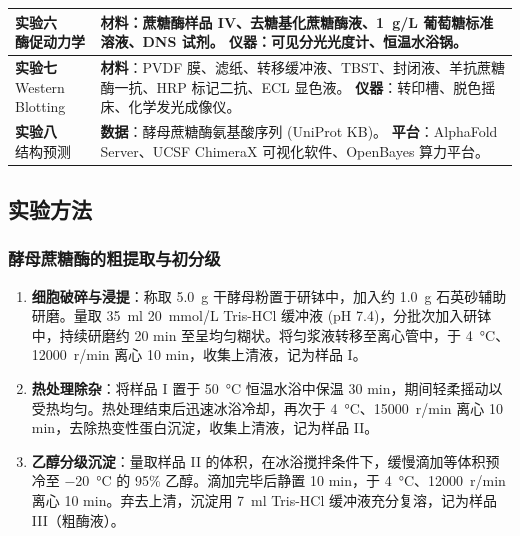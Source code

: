 \documentclass[10.5pt, a4paper]{ctexart}
\begin{document}
\begin{table}[H]
\begin{tabular}{m{3.5cm}<{\centering} m{11cm}}
        \makecell{\textbf{实验六} \\ 酶促动力学} & 
        \textbf{材料}：蔗糖酶样品 IV、去糖基化蔗糖酶液、\SI{1}{g/L} 葡萄糖标准溶液、DNS 试剂。 \newline
        \textbf{仪器}：可见分光光度计、恒温水浴锅。 \\
        \midrule
        
        \makecell{\textbf{实验七} \\ Western Blotting} & 
        \textbf{材料}：PVDF 膜、滤纸、转移缓冲液、TBST、封闭液、羊抗蔗糖酶一抗、HRP 标记二抗、ECL 显色液。 \newline
        \textbf{仪器}：转印槽、脱色摇床、化学发光成像仪。 \\
        \midrule
        
        \makecell{\textbf{实验八} \\ 结构预测} & 
        \textbf{数据}：酵母蔗糖酶氨基酸序列 (UniProt KB)。 \newline
        \textbf{平台}：AlphaFold Server、UCSF ChimeraX 可视化软件、OpenBayes 算力平台。 \\
        \bottomrule
    \end{tabular}
\end{table}

\subsection{实验方法}

\subsubsection{酵母蔗糖酶的粗提取与初分级}

\begin{enumerate}
    \item \textbf{细胞破碎与浸提}：\hspace{1em}称取 \SI{5.0}{g} 干酵母粉置于研钵中，加入约 \SI{1.0}{g} 石英砂辅助研磨。量取 \SI{35}{ml} \SI{20}{mmol/L} Tris-HCl 缓冲液 (pH 7.4)，分批次加入研钵中，持续研磨约 20 min 至呈均匀糊状。将匀浆液转移至离心管中，于 \SI{4}{\celsius}、\SI{12000}{r/min} 离心 10 min，收集上清液，记为样品 I。
    \item \textbf{热处理除杂}：将样品 I 置于 \SI{50}{\celsius} 恒温水浴中保温 30 min，期间轻柔摇动以受热均匀。热处理结束后迅速冰浴冷却，再次于 \SI{4}{\celsius}、\SI{15000}{r/min} 离心 10 min，去除热变性蛋白沉淀，收集上清液，记为样品 II。
    \item \textbf{乙醇分级沉淀}：量取样品 II 的体积，在冰浴搅拌条件下，缓慢滴加等体积预冷至 \SI{-20}{\celsius} 的 95\% 乙醇。滴加完毕后静置 10 min，于 \SI{4}{\celsius}、\SI{12000}{r/min} 离心 10 min。弃去上清，沉淀用 \SI{7}{ml} Tris-HCl 缓冲液充分复溶，记为样品 III（粗酶液）。
\end{enumerate}
\end{document}
